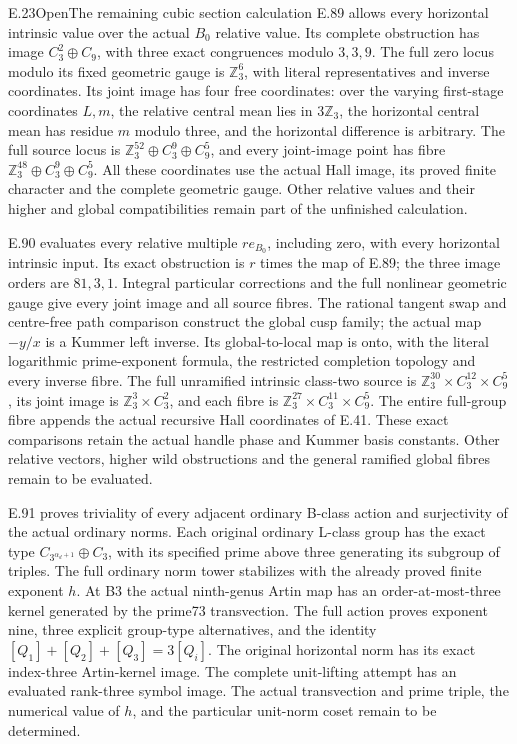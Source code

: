 \begin{statement}{E.23}{Open}{The remaining cubic section calculation}
E.89 allows every horizontal intrinsic value over the actual
\(B_0\) relative value. Its complete obstruction has image
\(C_3^2\oplus C_9\), with three exact congruences modulo
\(3,3,9\). The full zero locus modulo its fixed geometric
gauge is \(\mathbb Z_3^6\), with literal representatives
and inverse coordinates. Its joint image has four free
coordinates: over the varying first-stage coordinates
\(L,m\), the relative central mean lies in
\(3\mathbb Z_3\), the horizontal central mean has residue
\(m\) modulo three, and the horizontal difference is arbitrary.
The full source locus is
\(\mathbb Z_3^{52}\oplus C_3^9\oplus C_9^5\), and every
joint-image point has fibre
\(\mathbb Z_3^{48}\oplus C_3^9\oplus C_9^5\).
All these coordinates use the actual Hall image, its proved
finite character and the complete geometric gauge. Other
relative values and their higher and global compatibilities
remain part of the unfinished calculation.


E.90 evaluates every relative multiple \(r e_{B_0}\),
including zero, with every horizontal intrinsic input.
Its exact obstruction is \(r\) times the map of E.89;
the three image orders are \(81,3,1\). Integral
particular corrections and the full nonlinear geometric
gauge give every joint image and all source fibres.
The rational tangent swap and centre-free path comparison
construct the global cusp family; the actual map \(-y/x\)
is a Kummer left inverse. Its global-to-local map is onto,
with the literal logarithmic prime-exponent formula,
the restricted completion topology and every inverse fibre.
The full unramified intrinsic class-two source is
\(\mathbb Z_3^{30}\times C_3^{12}\times C_9^5\), its
joint image is \(\mathbb Z_3^3\times C_3^2\), and each
fibre is \(\mathbb Z_3^{27}\times C_3^{11}\times C_9^5\).
The entire full-group fibre appends the actual recursive
Hall coordinates of E.41. These exact comparisons retain
the actual handle phase and Kummer basis constants.
Other relative vectors, higher wild obstructions and
the general ramified global fibres remain to be evaluated.


E.91 proves triviality of every adjacent ordinary B-class
action and surjectivity of the actual ordinary norms.
Each original ordinary L-class group has the exact type
\(C_{3^{\alpha_d+1}}\oplus C_3\), with its specified
prime above three generating its subgroup of triples.
The full ordinary norm tower stabilizes with the already
proved finite exponent \(h\). At B3 the actual ninth-genus
Artin map has an order-at-most-three kernel generated by
the prime73 transvection. The full action proves exponent
nine, three explicit group-type alternatives, and the
identity \([Q_1]+[Q_2]+[Q_3]=3[Q_i]\). The original
horizontal norm has its exact index-three Artin-kernel
image. The complete unit-lifting attempt has an evaluated
rank-three symbol image. The actual transvection and
prime triple, the numerical value of \(h\), and the
particular unit-norm coset remain to be determined.



\end{statement}
